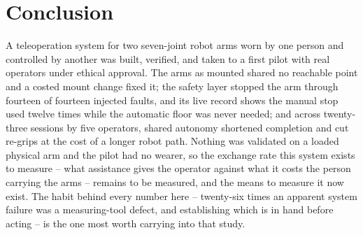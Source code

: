 \chapter{Conclusion}
\label{ch:conclusion}

A teleoperation system for two seven-joint robot arms worn by one person
and controlled by another was built, verified, and taken to a first pilot
with real operators under ethical approval. The arms as mounted shared no
reachable point and a costed mount change fixed it; the safety layer
stopped the arm through fourteen of fourteen injected faults, and its live
record shows the manual stop used twelve times while the automatic floor
was never needed; and across twenty-three sessions by five operators,
shared autonomy shortened completion and cut re-grips at the cost of a
longer robot path. Nothing
was validated on a loaded physical arm and the pilot had no wearer, so the
exchange rate this system exists to measure -- what assistance gives the
operator against what it costs the person carrying the arms -- remains to
be measured, and the means to measure it now exist. The habit behind every number here -- twenty-six times
an apparent system failure was a measuring-tool defect, and establishing
which is in hand before acting -- is the one most worth carrying into that
study.

